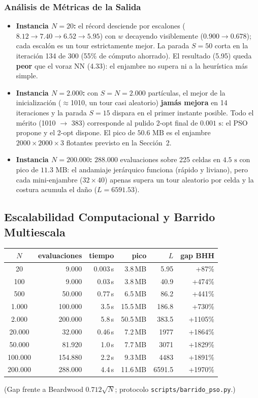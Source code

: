 \documentclass[11pt,a4paper]{article}
\begin{document}
\subsubsection{Análisis de Métricas de la Salida}
\begin{itemize}
    \item \textbf{Instancia $N=20$:} el récord desciende por escalones ($8{.}12 \to 7{.}40 \to 6{.}52 \to 5{.}95$) con $w$ decayendo visiblemente ($0{.}900 \to 0{.}678$); cada escalón es un tour estrictamente mejor. La parada $S=50$ corta en la iteración 134 de 300 (55\% de cómputo ahorrado). El resultado (5.95) queda \textbf{peor} que el voraz NN (4.33): el enjambre no supera ni a la heurística más simple.
    \item \textbf{Instancia $N=2.000$:} con $S=N=2.000$ partículas, el mejor de la inicialización ($\approx$1010, un tour casi aleatorio) \textbf{jamás mejora} en 14 iteraciones y la parada $S=15$ dispara en el primer instante posible. Todo el mérito (1010 $\to$ 383) corresponde al pulido 2-opt final de $0{.}001\text{ s}$: el PSO propone y el 2-opt dispone. El pico de $50{.}6\text{ MB}$ es el enjambre $2000\times2000\times3$ flotantes previsto en la Sección~2.
    \item \textbf{Instancia $N=200.000$:} $288.000$ evaluaciones sobre 225 celdas en $4{.}5\text{ s}$ con pico de $11{.}3\text{ MB}$: el andamiaje jerárquico funciona (rápido y liviano), pero cada mini-enjambre ($32\times40$) apenas supera un tour aleatorio por celda y la costura acumula el daño ($L=6591{.}53$).
\end{itemize}

\subsection{Escalabilidad Computacional y Barrido Multiescala}
\begin{center}
\begin{tabular}{@{}crrrrr@{}}
\toprule $N$ & evaluaciones & tiempo & pico & $L$ & gap BHH \\
\midrule 20 & 9.000 & 0.003\,s & 3.8\,MB & 5.95 & +87\% \\
100 & 9.000 & 0.03\,s & 3.8\,MB & 40.9 & +474\% \\
500 & 50.000 & 0.77\,s & 6.5\,MB & 86.2 & +441\% \\
1.000 & 100.000 & 3.5\,s & 15.5\,MB & 186.8 & +730\% \\
2.000 & 200.000 & 5.8\,s & 50.5\,MB & 383.5 & +1105\% \\
20.000 & 32.000 & 0.46\,s & 7.2\,MB & 1977 & +1864\% \\
50.000 & 81.920 & 1.0\,s & 7.7\,MB & 3071 & +1829\% \\
100.000 & 154.880 & 2.2\,s & 9.3\,MB & 4483 & +1891\% \\
200.000 & 288.000 & 4.4\,s & 11.6\,MB & 6591.5 & +1970\% \\
\bottomrule
\end{tabular}
\end{center}
(Gap frente a Beardwood $0{.}712\sqrt{N}$; protocolo \texttt{scripts/barrido\_pso.py}.)
\end{document}
